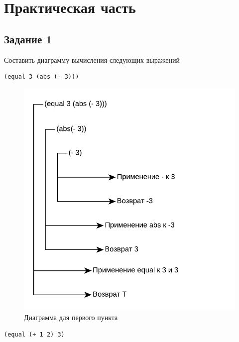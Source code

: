 \chapter{Практическая часть}

\section{Задание \No{}1}
Составить диаграмму вычисления следующих выражений

\lstset{language=lisp}
\begin{lstlisting}
(equal 3 (abs (- 3)))
\end{lstlisting}

\begin{figure}[H]
    \centering
    \includegraphics[scale=0.85]{data/pdf/task_1.pdf}
    \caption{Диаграмма для первого пункта}
\end{figure}

\begin{lstlisting}
(equal (+ 1 2) 3)
\end{lstlisting}

